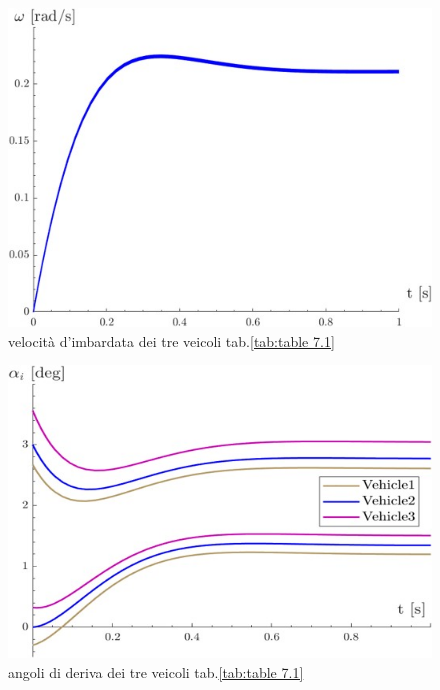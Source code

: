 \begin{figure}[!h]
    \centering
    \includegraphics[scale=0.6]{Immagini/Understeer Gradient/table7.1 r.jpg}
    \caption{velocità d'imbardata dei tre veicoli tab.\ref{tab:table 7.1}}
    \label{fig:table7.1 r}
\end{figure}

\begin{figure}[!h]
    \centering
    \includegraphics[scale=0.6]{Immagini/Understeer Gradient/table7.1 alfa.jpg}
    \caption{angoli di deriva dei tre veicoli tab.\ref{tab:table 7.1}}
    \label{fig:table7.1 alfa}
\end{figure}

